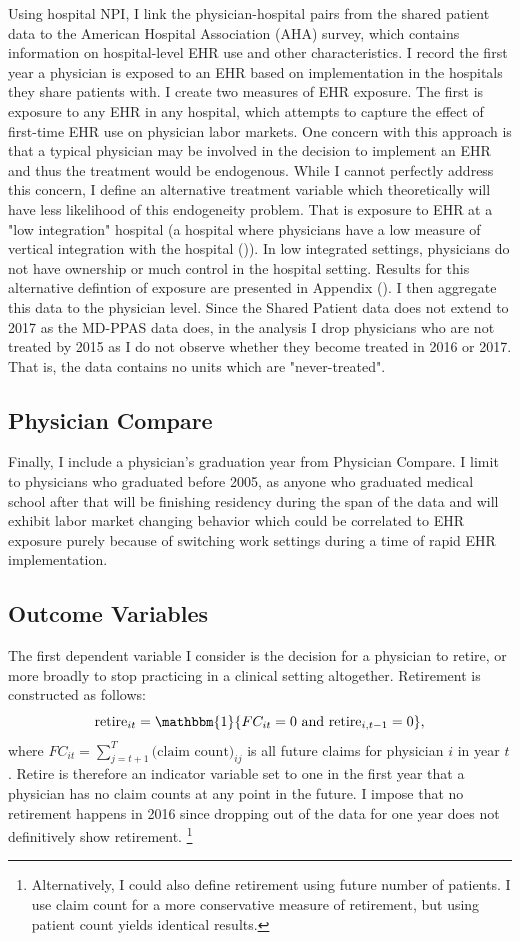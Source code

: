 \documentclass[11pt]{article}
\begin{document}
Using hospital NPI, I link the physician-hospital pairs from the shared patient data to the American Hospital Association (AHA) survey, which contains information on hospital-level EHR use and other characteristics. I record the first year a physician is exposed to an EHR based on implementation in the hospitals they share patients with. I create two measures of EHR exposure. The first is exposure to any EHR in any hospital, which attempts to capture the effect of first-time EHR use on physician labor markets. One concern with this approach is that a typical physician may be involved in the decision to implement an EHR and thus the treatment would be endogenous. While I cannot perfectly address this concern, I define an alternative treatment variable which theoretically will have less likelihood of this endogeneity problem. That is exposure to EHR at a "low integration" hospital (a hospital where physicians have a low measure of vertical integration with the hospital (\cite{madison2004hospital})). In low integrated settings, physicians do not have ownership or much control in the hospital setting. Results for this alternative defintion of exposure are presented in Appendix (). I then aggregate this data to the physician level. Since the Shared Patient data does not extend to 2017 as the MD-PPAS data does, in the analysis I drop physicians who are not treated by 2015 as I do not observe whether they become treated in 2016 or 2017. That is, the data contains no units which are "never-treated".

\subsection{Physician Compare}

Finally, I include a physician's graduation year from Physician Compare. I limit to physicians who graduated before 2005, as anyone who graduated medical school after that will be finishing residency during the span of the data and will exhibit labor market changing behavior which could be correlated to EHR exposure purely because of switching work settings during a time of rapid EHR implementation.

\subsection{Outcome Variables}\label{sec:outcome}

The first dependent variable I consider is the decision for a physician to retire, or more broadly to stop practicing in a clinical setting altogether. Retirement is constructed as follows: 
$$\text{retire}_{it}=\mathbbm{1}\{FC_{it}=0 \text{ and retire}_{i,t-1}=0\}, $$
where $FC_{it}=\sum\limits_{j=t+1}^T\text{(claim count)}_{ij}$ is all future claims for physician $i$ in year $t$. Retire is therefore an indicator variable set to one in the first year that a physician has no claim counts at any point in the future. I impose that no retirement happens in 2016 since dropping out of the data for one year does not definitively show retirement. \footnote{Alternatively, I could also define retirement using future number of patients. I use claim count for a more conservative measure of retirement, but using patient count yields identical results.}
\end{document}
